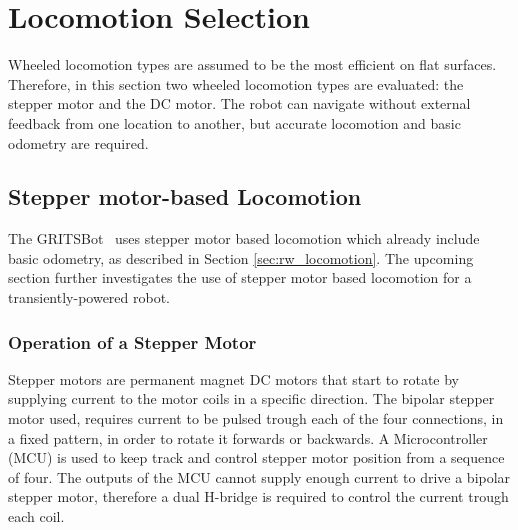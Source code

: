 \section{Locomotion Selection}
\label{sec:pre_locomotion_selection}

Wheeled locomotion types are assumed to be the most efficient on flat surfaces.
Therefore, in this section two wheeled locomotion types are evaluated: the stepper motor and the DC motor.
The robot can navigate without external feedback from one location to another, but accurate locomotion and basic odometry are required.

\subsection{Stepper motor-based Locomotion}

The GRITSBot~\cite{pickem_icra_2015} uses stepper motor based locomotion which already include basic odometry, as described in Section \ref{sec:rw_locomotion}.
The upcoming section further investigates the use of stepper motor based locomotion for a transiently-powered robot.

\subsubsection{Operation of a Stepper Motor}
Stepper motors are permanent magnet DC motors that start to rotate by supplying current to the motor coils in a specific direction.
The bipolar stepper motor used, requires current to be pulsed trough each of the four connections, in a fixed pattern, in order to rotate it forwards or backwards.
A Microcontroller (MCU) is used to keep track and control stepper motor position from a sequence of four.
The outputs of the MCU cannot supply enough current to drive a bipolar stepper motor, therefore a dual H-bridge is required to control the current trough each coil.


